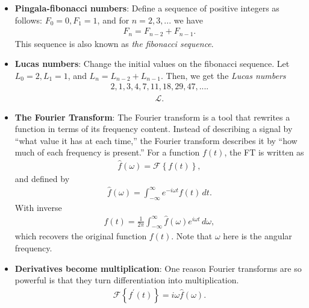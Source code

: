 \documentclass{report}
\begin{document}
\begin{itemize}
\begin{enumerate}
            \end{enumerate}
        \item \textbf{Pingala-fibonacci numbers}: Define a sequence of positive integers as follows: $F_{0} = 0, F_{1} = 1$, and for $n=2,3,... $ we have
            \begin{align*}
                F_{n} = F_{n-2} + F_{n-1}
            .\end{align*}
            This sequence is also known as \textit{the fibonacci sequence}.
        \item \textbf{Lucas numbers}: Change the initial values on the fibonacci sequence. Let $L_{0} = 2, L_{1} = 1$, and $L_{n} = L_{n-2} + L_{n-1}$. Then, we get the \textit{Lucas numbers}
            \begin{align*}
                2,1,3,4,7,11,18,29,47,...
            .\end{align*}
        \begin{align*}
            \mathcal{L}
        .\end{align*}

    \end{itemize}

    \pagebreak 
    \begin{itemize}
        \item \textbf{The Fourier Transform}: The Fourier transform is a tool that rewrites a function in terms of its frequency content. Instead of describing a signal by “what value it has at each time,” the Fourier transform describes it by “how much of each frequency is present.”
            \bigbreak \noindent 
            For a function $f(t)$, the FT is written as
            \begin{align*}
                \hat{f}(\omega) = \mathcal{F}\left\{f(t)\right\}
            ,\end{align*}
            and defined by
            \begin{align*}
                \hat{f}(\omega) = \int_{-\infty}^{\infty} e^{-i\omega t} f(t)\, dt
            .\end{align*}
            With inverse
            \begin{align*}
                f(t) = \frac{1}{2\pi}\int_{-\infty}^{\infty} \hat{f}(\omega)e^{i\omega t} \, d\omega
            ,\end{align*}
            which recovers the original function $f(t)$. Note that $\omega$ here is the angular frequency.
        \item \textbf{Derivatives become multiplication}:  One reason Fourier transforms are so powerful is that they turn differentiation into multiplication.
            \begin{align*}
                \mathcal{F}\left\{f^{\prime}(t)\right\} = i\omega\hat{f}(\omega)
            .\end{align*}





    \end{itemize}
\end{document}
